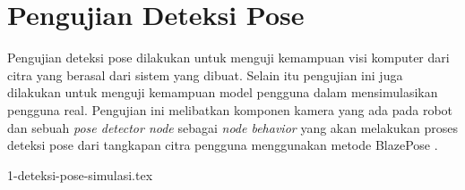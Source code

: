 \section{Pengujian Deteksi Pose}
\label{sec:pengujiandeteksipose}

Pengujian deteksi pose dilakukan untuk menguji kemampuan visi komputer dari citra yang berasal dari sistem yang dibuat.
Selain itu pengujian ini juga dilakukan untuk menguji kemampuan model pengguna dalam mensimulasikan pengguna real.
Pengujian ini melibatkan komponen kamera yang ada pada robot dan sebuah \emph{pose detector node} sebagai \emph{node behavior} yang akan melakukan proses deteksi pose dari tangkapan citra pengguna menggunakan metode BlazePose \citep{cit:bazarevsky2020}.

{1-deteksi-pose-simulasi.tex}
